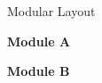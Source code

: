 \documentclass{article}
\begin{document}
{\Huge Modular Layout}

\vspace{1cm}

\begin{tcolorbox}[colback=cardbg,colframe=black]
\textbf{Module A}

\lipsum[1]
\end{tcolorbox}

\vspace{0.5cm}

\begin{tcolorbox}[colback=cardbg,colframe=black]
\textbf{Module B}

\lipsum[2]
\end{tcolorbox}
\end{document}
